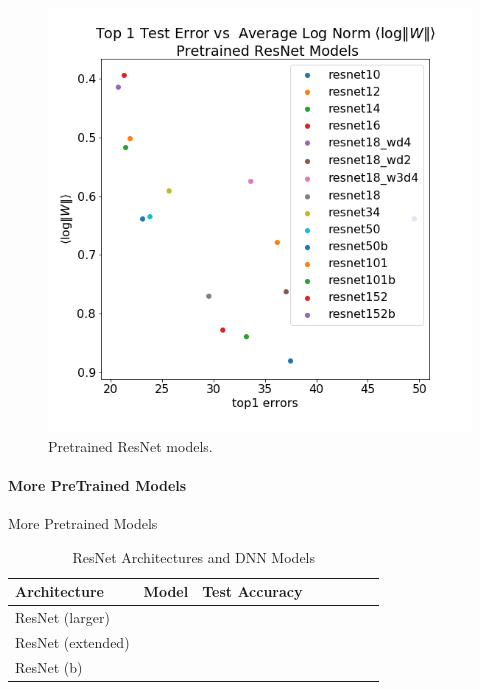 \begin{figure}[!htb]
 \centering
   \includegraphics[scale=0.40]{img/ResNet_top1-lognorms.png}
   \caption{
Pretrained ResNet models.
}
  \label{fig:resnet}
\end{figure}



\paragraph{More PreTrained Models}

More Pretrained Models


\begin{table}[t]
\small
\begin{center}
\begin{tabular}{|p{1in}|c|c|c|c|c|c|c|}
\hline
Architecture 
 & Model
 & Test Accuracy \\
\hline
ResNet (larger) & & \\
\hline
ResNet (extended) & & \\
\hline
ResNet (b) & & \\
\hline
\end{tabular}
\end{center}
\caption{ResNet Architectures and DNN Models}
\label{table:models}
\end{table}




